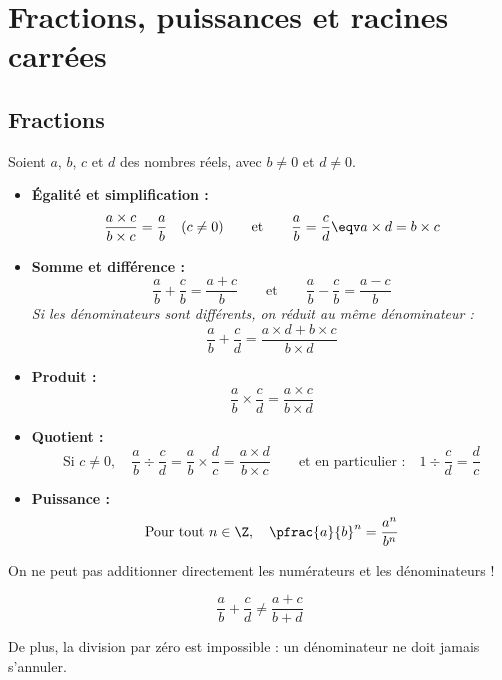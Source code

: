 \chapter{Fractions, puissances et racines carrées}

\section{Fractions}

\begin{prop}
	Soient $a$, $b$, $c$ et $d$ des nombres réels, avec $b \neq 0$ et $d \neq 0$.

	\begin{itemize}
		\item \textbf{Égalité et simplification :}
		      \[
			      \frac{a \times c}{b \times c} = \frac{a}{b} \quad (c \neq 0) \qquad \text{et} \qquad \frac{a}{b} = \frac{c}{d} \eqv a \times d = b \times c
		      \]

		\item \textbf{Somme et différence :}
		      \[
			      \frac{a}{b} + \frac{c}{b} = \frac{a + c}{b} \qquad \text{et} \qquad \frac{a}{b} - \frac{c}{b} = \frac{a - c}{b}
		      \]
		      \textit{Si les dénominateurs sont différents, on réduit au même dénominateur :}
		      \[
			      \frac{a}{b} + \frac{c}{d} = \frac{a \times d + b \times c}{b \times d}
		      \]

		\item \textbf{Produit :}
		      \[
			      \frac{a}{b} \times \frac{c}{d} = \frac{a \times c}{b \times d}
		      \]

		\item \textbf{Quotient :}
		      \[
			      \text{Si } c \neq 0, \quad \dfrac{a}{b} \div \dfrac{c}{d} = \frac{a}{b} \times \frac{d}{c} = \frac{a \times d}{b \times c} \qquad \text{et en particulier :} \quad 1 \div \dfrac{c}{d} = \frac{d}{c}
		      \]

		\item \textbf{Puissance :}
		      \[
			      \text{Pour tout } n \in \Z, \quad \pfrac{a}{b}^n = \frac{a^n}{b^n}
		      \]
	\end{itemize}
\end{prop}

\begin{attention}
	On ne peut pas additionner directement les numérateurs et les dénominateurs !

	\[
		\frac{a}{b} + \frac{c}{d} \neq \frac{a + c}{b + d}
	\]

	De plus, la division par zéro est impossible : un dénominateur ne doit jamais s'annuler.
\end{attention}


